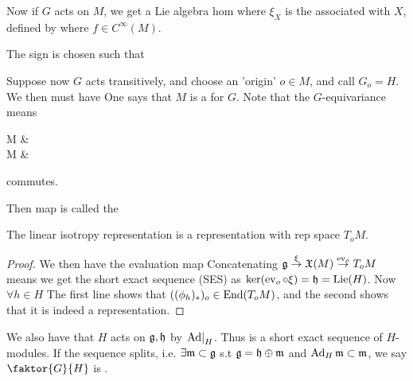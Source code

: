 \documentclass{article}
\begin{document}
Now if $G$ acts on $M$, we get a Lie algebra hom 
where $\xi_X$ is the  associated with $X$, defined by 
where $f \in C^\infty(M)$. 
\begin{fact}
The sign is chosen such that 
\end{fact}

Suppose now $G$ acts transitively, and choose an 'origin' $o \in M$, and call $G_o=H$. We then must have 
One says that $M$ is a  for $G$. Note that the $G$-equivariance means 
\begin{tkz}
M \arrow[r,"\cong"] \arrow[d,"\phi_g"'] &  \arrow[d,"L_g"]\\ M \arrow[r,"\cong"] & 
\end{tkz}
commutes. 

\begin{definition}
Then map 
is called the 
\end{definition}
\begin{prop}
The linear isotropy representation is a representation with rep space $T_oM$. 
\end{prop}
\begin{proof}
We then have the evaluation map 
Concatenating $\mathfrak{g} \overset{\xi}{\to} \mathfrak{X}(M) \overset{\operatorname{ev}_o}{\to} T_oM$ means we get the short exact sequence (SES)
as $\ker(\operatorname{ev}_o \circ \xi) = \mathfrak{h} = \operatorname{Lie}(H)$. Now $\forall h \in H$
The first line shows that $((\phi_h)_\ast)_o \in \operatorname{End}(T_oM)$, and the second shows that it is indeed a representation. 
\end{proof}

\begin{idea}
We also have that $H$ acts on $\mathfrak{g},\mathfrak{h}$ by $\left. \operatorname{Ad} \right\rvert_{H}$. Thus
is a short exact sequence of $H$-modules. If the sequence splits, i.e. $\exists \mathfrak{m} \subset \mathfrak{g}$ s.t $\mathfrak{g} = \mathfrak{h} \oplus \mathfrak{m}$ and $\operatorname{Ad}_H \mathfrak{m} \subset \mathfrak{m}$, we say $\faktor{G}{H}$ is .
\end{idea}
\end{document}

